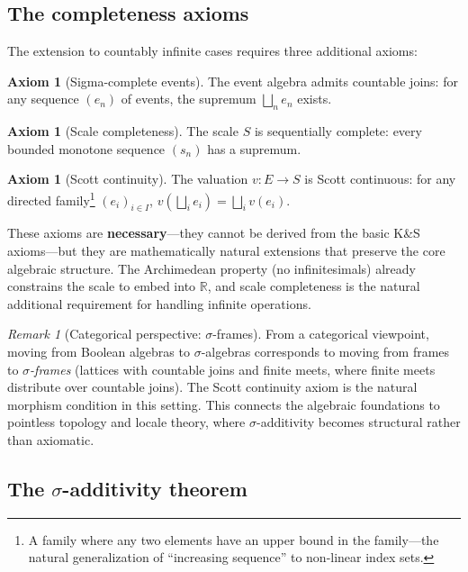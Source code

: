 \documentclass[11pt]{article}
\theoremstyle{definition}
\newtheorem{axiom}[theorem]{Axiom}
\theoremstyle{remark}
\newtheorem{remark}[theorem]{Remark}
\begin{document}
\subsection{The completeness axioms}

The extension to countably infinite cases requires three additional axioms:

\begin{axiom}[Sigma-complete events]
The event algebra admits countable joins: for any sequence $(e_n)$ of events,
the supremum $\bigsqcup_n e_n$ exists.
\end{axiom}

\begin{axiom}[Scale completeness]
The scale $S$ is sequentially complete: every bounded monotone sequence $(s_n)$ has a supremum.
\end{axiom}

\begin{axiom}[Scott continuity]
The valuation $v : E \to S$ is Scott continuous: for any directed family\footnote{A family
where any two elements have an upper bound in the family---the natural generalization
of ``increasing sequence'' to non-linear index sets.} $(e_i)_{i \in I}$,
$v(\bigsqcup_i e_i) = \bigsqcup_i v(e_i)$.
\end{axiom}

These axioms are \textbf{necessary}---they cannot be derived from the basic K\&S axioms---but
they are mathematically natural extensions that preserve the core algebraic structure.
The Archimedean property (no infinitesimals) already constrains the scale to embed into $\mathbb{R}$,
and scale completeness is the natural additional requirement for handling infinite operations.

\begin{remark}[Categorical perspective: $\sigma$-frames]
From a categorical viewpoint, moving from Boolean algebras to $\sigma$-algebras corresponds to
moving from frames to \emph{$\sigma$-frames} (lattices with countable joins and finite meets,
where finite meets distribute over countable joins).  The Scott continuity axiom is the
natural morphism condition in this setting.  This connects the algebraic foundations to
pointless topology and locale theory, where $\sigma$-additivity becomes structural rather
than axiomatic.
\end{remark}

\subsection{The $\sigma$-additivity theorem}
\end{document}

